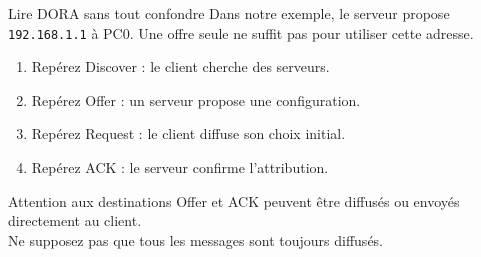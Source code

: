 \documentclass[aspectratio=169,11pt]{beamer}
\newenvironment{schema}{%
  \begin{beamercolorbox}[sep=8pt,rounded=true]{block body}
  \centering\begin{tikzpicture}[>=Stealth]
}{\end{tikzpicture}\end{beamercolorbox}}
\begin{document}
\begin{frame}{Lire DORA sans tout confondre}
  Dans notre exemple, le serveur propose \texttt{192.168.1.1} à PC0.
  Une offre seule ne suffit pas pour utiliser cette adresse.
  \begin{enumerate}
    \item Repérez Discover : le client cherche des serveurs.
    \item Repérez Offer : un serveur propose une configuration.
    \item Repérez Request : le client diffuse son choix initial.
    \item Repérez ACK : le serveur confirme l'attribution.
  \end{enumerate}
  \begin{block}{Attention aux destinations}
    Offer et ACK peuvent être diffusés ou envoyés directement au client.\\
    Ne supposez pas que tous les messages sont toujours diffusés.
  \end{block}
\end{frame}

\end{document}
